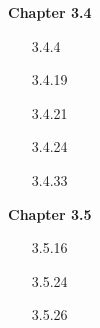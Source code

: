 \documentclass[10pt,twoside,reqno]{article}
\begin{document}
\begin{enumerate}
\end{enumerate}
\vspace{5mm}
\textbf{Chapter 3.4}
\begin{enumerate}
\item[3.4.4] 
\vspace{3mm}



\item[3.4.19] 



\item[3.4.21] 



\item[3.4.24] 



\item[3.4.33]  



\end{enumerate}
\vspace{5mm}
\textbf{Chapter 3.5}
\begin{enumerate}
\item[3.5.16]  



\item[3.5.24]  



\item[3.5.26]  



\end{enumerate}
\end{document}
